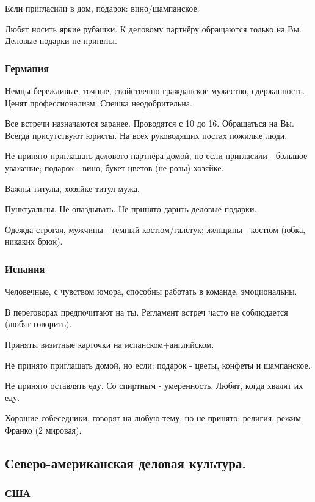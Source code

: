 Если пригласили в дом, подарок: вино/шампанское.

Любят носить яркие рубашки. К деловому партнёру обращаются только на Вы. Деловые подарки не приняты.

\subsubsection{Германия}

Немцы бережливые, точные, свойственно гражданское мужество, сдержанность. Ценят профессионализм. Спешка неодобрительна.

Все встречи назначаются заранее. Проводятся с 10 до 16. Обращаться на Вы. Всегда присутствуют юристы. На всех руководящих постах пожилые люди.

Не принято приглашать делового партнёра домой, но если пригласили - большое уважение; подарок - вино, букет цветов (не розы) хозяйке.

Важны титулы, хозяйке титул мужа.

Пунктуальны. Не опаздывать. Не принято дарить деловые подарки.

Одежда строгая, мужчины - тёмный костюм/галстук; женщины - костюм (юбка, никаких брюк).

\subsubsection{Испания}

Человечные, с чувством юмора, способны работать в команде, эмоциональны.

В переговорах предпочитают на ты. Регламент встреч часто не соблюдается (любят говорить).

Приняты визитные карточки на испанском+английском.

Не принято приглашать домой, но если: подарок - цветы, конфеты и шампанское.

Не принято оставлять еду. Со спиртным - умеренность. Любят, когда хвалят их еду.

Хорошие собеседники, говорят на любую тему, но не принято: религия, режим Франко (2 мировая).

\subsection{Северо-американская деловая культура.}

\subsubsection{США}

